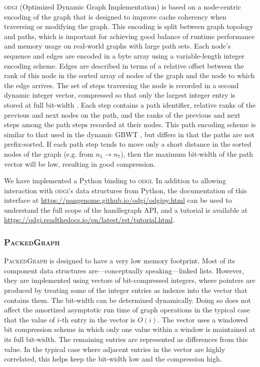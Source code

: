 \documentclass{article}
\begin{document}
\textsc{odgi} (Optimized Dynamic Graph Implementation) is based on a node-centric encoding of the graph that is designed to improve cache coherency when traversing or modifying the graph.
This encoding is split between graph topology and paths, which is important for achieving good balance of runtime performance and memory usage on real-world graphs with large path sets.
Each node's sequence and edges are encoded in a byte array using a variable-length integer encoding scheme.
Edges are described in terms of a relative offset between the rank of this node in the sorted array of nodes of the graph and the node to which the edge arrives.
The set of steps traversing the node is recorded in a second dynamic integer vector, compressed so that only the largest integer entry is stored at full bit-width \cite{prezza2017framework}.
Each step contains a path identifier, relative ranks of the previous and next nodes on the path, and the ranks of the previous and next steps among the path steps recorded at their nodes.
This path encoding scheme is similar to that used in the dynamic GBWT \cite{Siren_2019}, but differs in that the paths are not prefix-sorted.
If each path step tends to move only a short distance in the sorted nodes of the graph (e.g. from $n_{5} \to n_{7}$), then the maximum bit-width of the path vector will be low, resulting in good compression.

We have implemented a Python binding to \textsc{odgi}. 
In addition to allowing interaction with \textsc{odgi}'s data structures from Python, the documentation of this interface at \url{https://pangenome.github.io/odgi/odgipy.html} can be used to understand the full scope of the handlegraph API, and a tutorial is available at \url{https://odgi.readthedocs.io/en/latest/rst/tutorial.html}.

\subsubsection{\textsc{PackedGraph}}

\textsc{PackedGraph} is designed to have a very low memory footprint.
Most of its component data structures are---conceptually speaking---linked lists.
However, they are implemented using vectors of bit-compressed integers, where pointers are produced by treating some of the integer entries as indexes into the vector that contains them.
The bit-width can be determined dynamically.
Doing so does not affect the amortized asymptotic run time of graph operations in the typical case that the value of $i$-th entry in the vector is $O(i)$.
The vector uses a windowed bit compression scheme in which only one value within a window is maintained at its full bit-width.
The remaining entries are represented as differences from this value.
In the typical case where adjacent entries in the vector are highly correlated, this helps keep the bit-width low and the compression high. 
\end{document}
